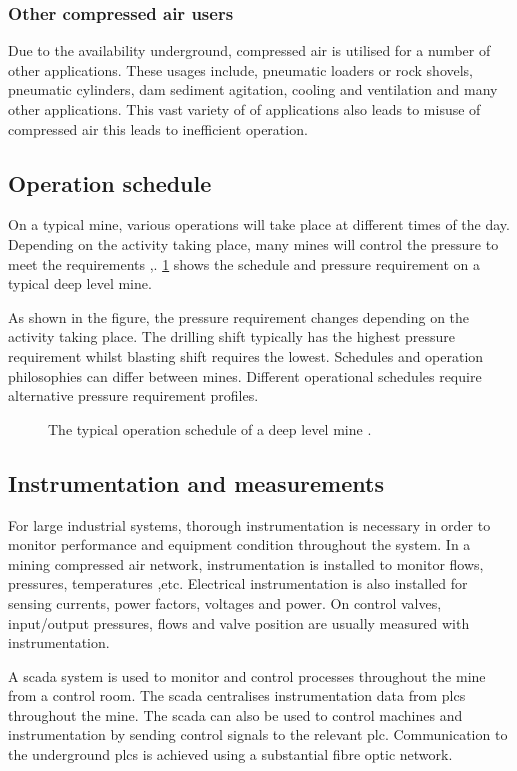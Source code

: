 \subsubsection{Other compressed air users}
Due to the availability underground, compressed air is utilised for a number of other applications. These usages include, pneumatic loaders or rock shovels, pneumatic cylinders, dam sediment agitation, cooling and ventilation and many other applications. This vast variety of of applications also leads to misuse of compressed air this leads to inefficient operation.
\subsection{Operation schedule}
On a typical mine, various operations will take place at different times of the day. Depending on the activity taking place, many mines will control the pressure to meet the requirements \cite{Kriel2014Masters},\cite{Marais2012PhD}. \cref{fig: Mining schedule} shows the schedule and pressure requirement on a typical deep level mine.\par 
As shown in the figure, the pressure requirement changes depending on the activity taking place. The drilling shift typically has the highest pressure requirement whilst blasting shift requires the lowest. Schedules and operation philosophies can differ between mines. Different operational schedules require alternative pressure requirement profiles.
\begin{figure}[h]
	\centering
	\fbox{}
	\caption[A typical operation schedule of a deep level mine.]{The typical operation schedule of a deep level mine \cite{Kriel2014Masters}.}
	\label{fig: Mining schedule}
\end{figure}
\subsection{Instrumentation and measurements}
For large industrial systems, thorough instrumentation is necessary in order to monitor performance and equipment condition throughout the system. In a mining compressed air network, instrumentation is installed to monitor flows, pressures, temperatures ,etc. Electrical instrumentation is also installed for sensing currents, power factors, voltages and power. On control valves, input/output pressures, flows and valve position are usually measured with instrumentation.	
\par
A \gls{scada} system is used to monitor and control processes throughout the mine from a control room. The \gls{scada} centralises instrumentation data from \glspl{plc} throughout the mine. The \gls{scada} can also be used to control machines and instrumentation by sending control signals to the relevant \gls{plc}.  Communication to the underground \glspl{plc} is achieved using a substantial fibre optic network.\cite{schroeder2009energy}
\clearpage
